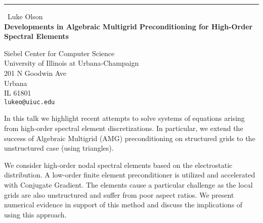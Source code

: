 \documentclass{report}
\begin{document}
\begin{center}
\rule{6in}{1pt} \
{\large Luke Olson \\
{\bf Developments in Algebraic Multigrid Preconditioning for High-Order Spectral Elements}}

Siebel Center for Computer Science \\ University of Illinois at Urbana-Champaign \\ 201 N Goodwin Ave \\ Urbana  \\ IL 61801
\\
{\tt lukeo@uiuc.edu}\end{center}

In this talk we highlight recent attempts to solve systems of equations
arising from high-order spectral element discretizations. In particular, we
extend the success of Algebraic Multigrid (AMG) preconditioning on
structured grids to the unstructured case (using triangles).

We consider high-order nodal spectral elements based on the electrostatic
distribution. A low-order finite element preconditioner is utilized and
accelerated with Conjugate Gradient. The elements cause a particular
challenge as the local grids are also unstructured and suffer from poor
aspect ratios. We present numerical evidence in support of this method
and discuss the implications of using this approach.
\end{document}
